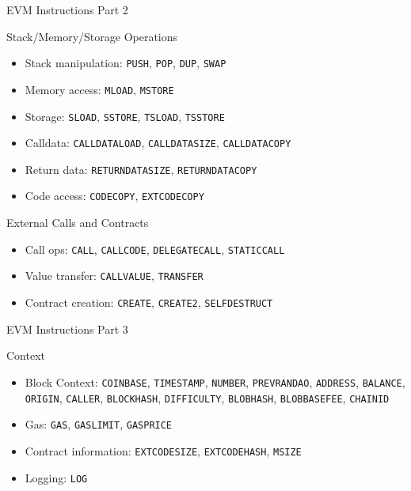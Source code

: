 \documentclass[aspectratio=169]{beamer}
\begin{document}
\begin{frame}{EVM Instructions Part 2}
\begin{block}{Stack/Memory/Storage Operations}
\begin{itemize}
    \item Stack manipulation: \texttt{PUSH}, \texttt{POP}, \texttt{DUP}, \texttt{SWAP}
    \item Memory access: \texttt{MLOAD}, \texttt{MSTORE}
    \item Storage: \texttt{SLOAD}, \texttt{SSTORE}, \texttt{TSLOAD}, \texttt{TSSTORE}
    \item Calldata: \texttt{CALLDATALOAD}, \texttt{CALLDATASIZE}, \texttt{CALLDATACOPY}
    \item Return data: \texttt{RETURNDATASIZE}, \texttt{RETURNDATACOPY}
    \item Code access: \texttt{CODECOPY}, \texttt{EXTCODECOPY}
\end{itemize}
\end{block}


\begin{block}{External Calls and Contracts}
\begin{itemize}
    \item Call ops: \texttt{CALL}, \texttt{CALLCODE}, \texttt{DELEGATECALL}, \texttt{STATICCALL}
    \item Value transfer: \texttt{CALLVALUE}, \texttt{TRANSFER}
    \item Contract creation: \texttt{CREATE}, \texttt{CREATE2}, \texttt{SELFDESTRUCT}
\end{itemize}
\end{block}
\end{frame}

\begin{frame}{EVM Instructions Part 3}
\begin{block}{Context}
\begin{itemize}
    \item Block Context: \texttt{COINBASE}, \texttt{TIMESTAMP}, \texttt{NUMBER},
        \texttt{PREVRANDAO},
        \texttt{ADDRESS}, \texttt{BALANCE}, \texttt{ORIGIN},  \texttt{CALLER},
        \texttt{BLOCKHASH}, \texttt{DIFFICULTY}, \texttt{BLOBHASH}, \texttt{BLOBBASEFEE}, \texttt{CHAINID}
    \item Gas: \texttt{GAS}, \texttt{GASLIMIT}, \texttt{GASPRICE}
    \item Contract information: \texttt{EXTCODESIZE}, \texttt{EXTCODEHASH}, \texttt{MSIZE}
    \item Logging: \texttt{LOG}
\end{itemize}
\end{block}
\end{frame}
\end{document}
